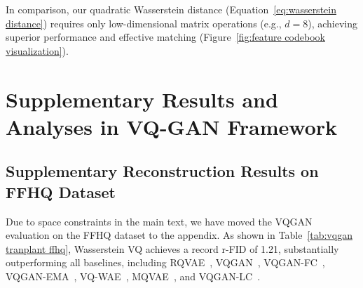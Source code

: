 In comparison, our quadratic Wasserstein distance (Equation~\ref{eq:wasserstein distance}) requires only low-dimensional matrix operations (e.g., $d=8$), achieving superior performance and effective matching (Figure~\ref{fig:feature codebook visualization}).


\iffalse
\section{Supplementary Results and Analyses in VQ-GAN Framework}

\subsection{Supplementary Reconstruction Results on FFHQ Dataset}
\label{appendix:supplement results on ffhq}
Due to space constraints in the main text, we have moved the VQGAN  evaluation on the FFHQ dataset to the appendix. As shown in Table~\ref{tab:vqgan tranplant ffhq}, Wasserstein VQ achieves a record r-FID of 1.21, substantially outperforming all baselines, including RQVAE~\cite{Lee2022AutoregressiveIG}, VQGAN~\cite{Esser2020TamingTF}, VQGAN-FC~\cite{Yu2021VectorquantizedIM}, VQGAN-EMA~\cite{Razavi2019GeneratingDH}, VQ-WAE~\cite{Vuong2023VectorQW}, MQVAE~\cite{Huang2023NotAI}, and VQGAN-LC~\cite{Zhu2024ScalingTC}.

